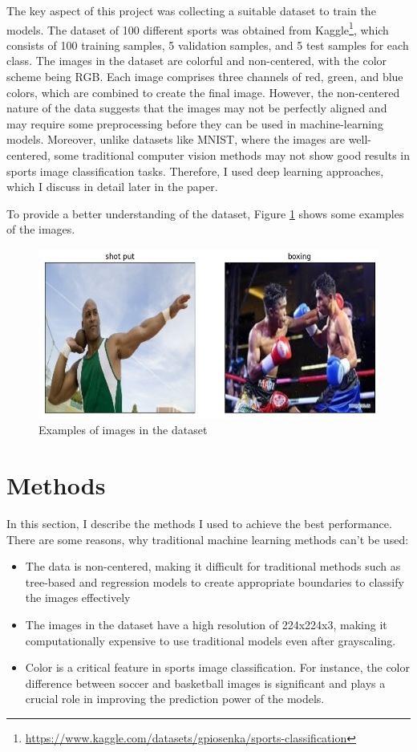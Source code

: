 \documentclass[reqno]{article}
\begin{document}
	The key aspect of this project was collecting a suitable dataset to train the models. The dataset of 100 different sports was obtained from Kaggle\footnote{\url{https://www.kaggle.com/datasets/gpiosenka/sports-classification}}, which consists of 100 training samples, 5 validation samples, and 5 test samples for each class. The images in the dataset are colorful and non-centered, with the color scheme being RGB. Each image comprises three channels of red, green, and blue colors, which are combined to create the final image. However, the non-centered nature of the data suggests that the images may not be perfectly aligned and may require some preprocessing before they can be used in machine-learning models. Moreover, unlike datasets like MNIST, where the images are well-centered, some traditional computer vision methods may not show good results in sports image classification tasks. Therefore, I used deep learning approaches, which I discuss in detail later in the paper. 
	
	To provide a better understanding of the dataset, Figure \ref{examples} shows some examples of the images.
	
		\begin{figure}[h]
			\centering
			\includegraphics[width=0.5\linewidth]{Example_of_images.png}
			\caption{Examples of images in the dataset}
			\label{examples}
		\end{figure}
	
	\section{Methods}
	
	In this section, I describe the methods I used to achieve the best performance. There are some reasons, why traditional machine learning methods can't be used:
	
	\begin{itemize}
		\item The data is non-centered, making it difficult for traditional methods such as tree-based and regression models to create appropriate boundaries to classify the images effectively
		\item The images in the dataset have a high resolution of 224x224x3, making it computationally expensive to use traditional models even after grayscaling. 
		\item Color is a critical feature in sports image classification. For instance, the color difference between soccer and basketball images is significant and plays a crucial role in improving the prediction power of the models.
	\end{itemize}
	
\end{document}
